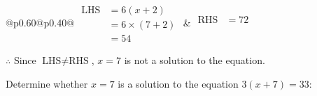 \documentclass[12pt]{article}
\newcounter{minipagecount}
\begin{document}
\begin{multicols}{2}
\begin{minipage}[t]{0.40\textwidth}
    \renewcommand{\arraystretch}{1.3} %
    \begin{tabular}{@{}p{0.60\linewidth}@{}p{0.40\linewidth}@{}}
        \(\begin{aligned}
            \text{LHS} &= 6(x + 2) \\
                    &= 6 \times(7 + 2) \\
                    &= 54
        \end{aligned}\) &
        \(\begin{aligned}
            \text{RHS} &= 72\\
                    & \\
                    &
        \end{aligned}\)
    \end{tabular}
    \renewcommand{\arraystretch}{1.0} %
    \vspace{2pt}  %

    \noindent \(\therefore\) Since \(\text{LHS} \neq \text{RHS}\), \(x = 7\) is not  a solution to the equation.

\end{minipage}

 \vspace*{16pt}
\columnbreak
\noindent{(\theminipagecount)}\hspace{0.1mm} %
\begin{minipage}[t]{0.40\textwidth} %

    \noindent Determine whether \(x = 7\) is a solution to the equation \(3(x + 7) = 33\):
    \vspace{4pt}  %

    \noindent


\end{minipage}
\end{multicols}
\end{document}
